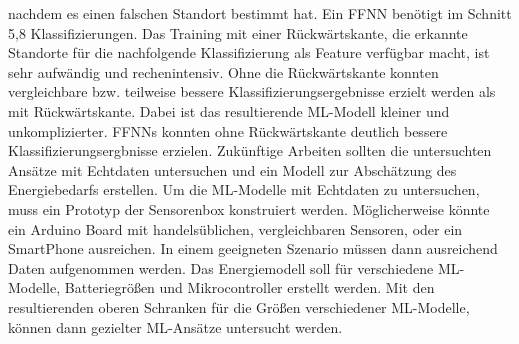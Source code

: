 nachdem es einen falschen Standort bestimmt hat.
Ein FFNN benötigt im Schnitt 5,8 Klassifizierungen.
\newline
\newline
Das Training mit einer Rückwärtskante, die erkannte Standorte für die nachfolgende Klassifizierung als Feature verfügbar macht, ist sehr aufwändig und rechenintensiv.
Ohne die Rückwärtskante konnten vergleichbare bzw. teilweise bessere Klassifizierungsergebnisse erzielt werden als mit Rückwärtskante.
Dabei ist das resultierende ML-Modell kleiner und unkomplizierter.
FFNNs konnten ohne Rückwärtskante deutlich bessere Klassifizierungsergbnisse erzielen.
\newline
\newline
Zukünftige Arbeiten sollten die untersuchten Ansätze mit Echtdaten untersuchen und ein Modell zur Abschätzung des Energiebedarfs erstellen.
Um die ML-Modelle mit Echtdaten zu untersuchen, muss ein Prototyp der Sensorenbox konstruiert werden.
Möglicherweise könnte ein Arduino Board mit handelsüblichen, vergleichbaren Sensoren, oder ein SmartPhone ausreichen.
In einem geeigneten Szenario müssen dann ausreichend Daten aufgenommen werden.
\newline
\newline
Das Energiemodell soll für verschiedene ML-Modelle, Batteriegrößen und Mikrocontroller erstellt werden.
Mit den resultierenden oberen Schranken für die Größen verschiedener ML-Modelle,
können dann gezielter ML-Ansätze untersucht werden.